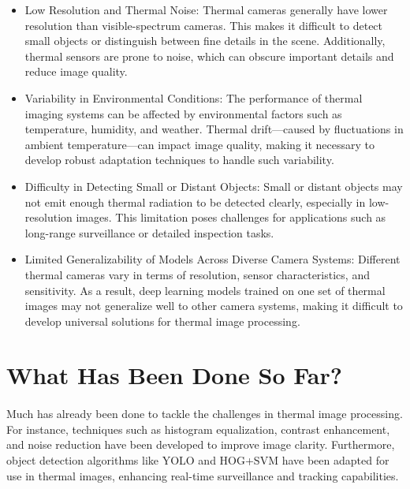 \documentclass[11pt,a4paper]{report}
\begin{document}
\begin{itemize}
    \item Low Resolution and Thermal Noise: Thermal cameras generally have lower resolution than visible-spectrum cameras. This makes it difficult to detect small objects or distinguish between fine details in the scene. Additionally, thermal sensors are prone to noise, which can obscure important details and reduce image quality.

    \item Variability in Environmental Conditions: The performance of thermal imaging systems can be affected by environmental factors such as temperature, humidity, and weather. Thermal drift—caused by fluctuations in ambient temperature—can impact image quality, making it necessary to develop robust adaptation techniques to handle such variability.

    \item Difficulty in Detecting Small or Distant Objects: Small or distant objects may not emit enough thermal radiation to be detected clearly, especially in low-resolution images. This limitation poses challenges for applications such as long-range surveillance or detailed inspection tasks.

    \item Limited Generalizability of Models Across Diverse Camera Systems: Different thermal cameras vary in terms of resolution, sensor characteristics, and sensitivity. As a result, deep learning models trained on one set of thermal images may not generalize well to other camera systems, making it difficult to develop universal solutions for thermal image processing.

\end{itemize}

\section{What Has Been Done So Far?}

\paragraph{ } Much has already been done to tackle the challenges in thermal image processing. For instance, techniques such as histogram equalization, contrast enhancement, and noise reduction have been developed to improve image clarity. Furthermore, object detection algorithms like YOLO and HOG+SVM have been adapted for use in thermal images, enhancing real-time surveillance and tracking capabilities.
\end{document}
